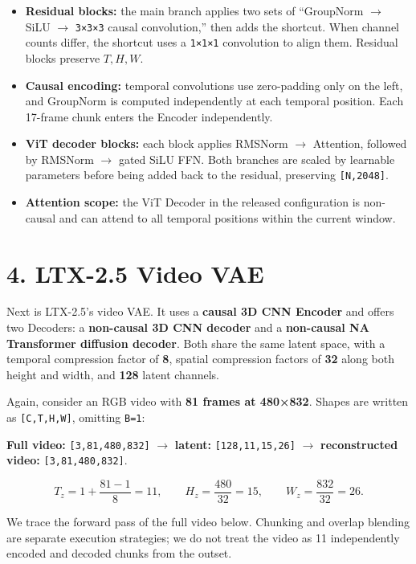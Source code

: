 \documentclass[
  11pt,
  a4paper,
]{article}
\providecommand{\tightlist}{%
  \setlength{\itemsep}{0pt}\setlength{\parskip}{0pt}}
\newcommand{\NotesLTXLayout}{%
  \clearpage
  \fancyhead[L]{\small\sffamily\color{notesgray}Video VAE / LTX-2.5 Details}%
}
\begin{document}
\begin{itemize}
\tightlist
\item
  \textbf{Residual blocks:} the main branch applies two sets of
  ``GroupNorm \(\rightarrow\) SiLU \(\rightarrow\) \texttt{3×3×3} causal
  convolution,'' then adds the shortcut. When channel counts differ, the
  shortcut uses a \texttt{1×1×1} convolution to align them. Residual
  blocks preserve \(T,H,W\).
\item
  \textbf{Causal encoding:} temporal convolutions use zero-padding only
  on the left, and GroupNorm is computed independently at each temporal
  position. Each 17-frame chunk enters the Encoder independently.
\item
  \textbf{ViT decoder blocks:} each block applies RMSNorm
  \(\rightarrow\) Attention, followed by RMSNorm \(\rightarrow\) gated
  SiLU FFN. Both branches are scaled by learnable parameters before
  being added back to the residual, preserving \texttt{{[}N,2048{]}}.
\item
  \textbf{Attention scope:} the ViT Decoder in the released
  configuration is non-causal and can attend to all temporal positions
  within the current window.
\end{itemize}

\NotesLTXLayout

\section{4. LTX-2.5 Video VAE}\label{ltx25}

Next is LTX-2.5's video VAE. It uses a \textbf{causal 3D CNN Encoder}
and offers two Decoders: a \textbf{non-causal 3D CNN decoder} and a
\textbf{non-causal NA Transformer diffusion decoder}. Both share the
same latent space, with a temporal compression factor of \textbf{8},
spatial compression factors of \textbf{32} along both height and width,
and \textbf{128} latent channels.

Again, consider an RGB video with \textbf{81 frames at 480×832}. Shapes
are written as \texttt{{[}C,T,H,W{]}}, omitting \texttt{B=1}:

\textbf{Full video:} \texttt{{[}3,81,480,832{]}} \(\rightarrow\)
\textbf{latent:} \texttt{{[}128,11,15,26{]}} \(\rightarrow\)
\textbf{reconstructed video:} \texttt{{[}3,81,480,832{]}}.

\[
T_z=1+\frac{81-1}{8}=11,\qquad H_z=\frac{480}{32}=15,\qquad W_z=\frac{832}{32}=26.
\]

We trace the forward pass of the full video below. Chunking and overlap
blending are separate execution strategies; we do not treat the video as
11 independently encoded and decoded chunks from the outset.
\end{document}
